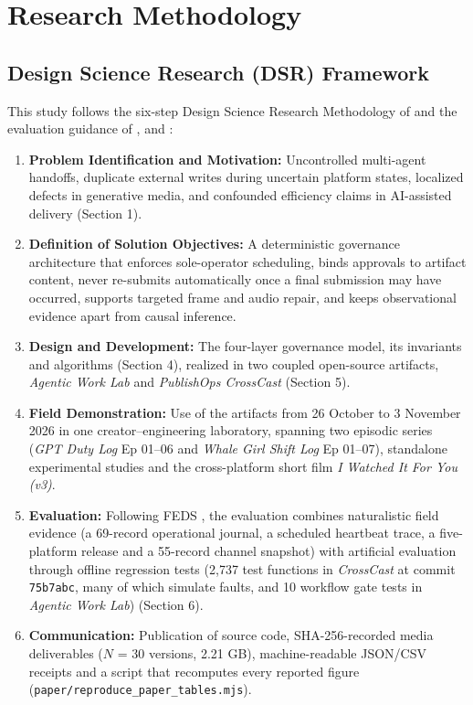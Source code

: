 \documentclass[11pt,a4paper]{article}
\theoremstyle{definition}
\begin{document}
\section{Research Methodology}
\label{sec:3}

\subsection{Design Science Research (DSR) Framework}
\label{sec:3.1}

This study follows the six-step Design Science Research Methodology of \citet{Peffers2007} and the evaluation guidance of \citet{Hevner2004}, \citet{Gregor2013} and \citet{Venable2016}:

\begin{enumerate}[leftmargin=1.8em]
    \item \textbf{Problem Identification and Motivation:} Uncontrolled multi-agent handoffs, duplicate external writes during uncertain platform states, localized defects in generative media, and confounded efficiency claims in AI-assisted delivery (Section 1).
    \item \textbf{Definition of Solution Objectives:} A deterministic governance architecture that enforces sole-operator scheduling, binds approvals to artifact content, never re-submits automatically once a final submission may have occurred, supports targeted frame and audio repair, and keeps observational evidence apart from causal inference.
    \item \textbf{Design and Development:} The four-layer governance model, its invariants and algorithms (Section 4), realized in two coupled open-source artifacts, \emph{Agentic Work Lab} and \emph{PublishOps CrossCast} (Section 5).
    \item \textbf{Field Demonstration:} Use of the artifacts from 26 October to 3 November 2026 in one creator--engineering laboratory, spanning two episodic series (\emph{GPT Duty Log} Ep 01--06 and \emph{Whale Girl Shift Log} Ep 01--07), standalone experimental studies and the cross-platform short film \emph{I Watched It For You (v3)}.
    \item \textbf{Evaluation:} Following FEDS \citep{Venable2016}, the evaluation combines naturalistic field evidence (a 69-record operational journal, a scheduled heartbeat trace, a five-platform release and a 55-record channel snapshot) with artificial evaluation through offline regression tests (2,737 test functions in \emph{CrossCast} at commit \texttt{75b7abc}, many of which simulate faults, and 10 workflow gate tests in \emph{Agentic Work Lab}) (Section 6).
    \item \textbf{Communication:} Publication of source code, SHA-256-recorded media deliverables ($N$ = 30 versions, 2.21 GB), machine-readable JSON/CSV receipts and a script that recomputes every reported figure (\texttt{paper/\allowbreak{}reproduce\_\allowbreak{}paper\_\allowbreak{}tables.\allowbreak{}mjs}).
\end{enumerate}
\end{document}

